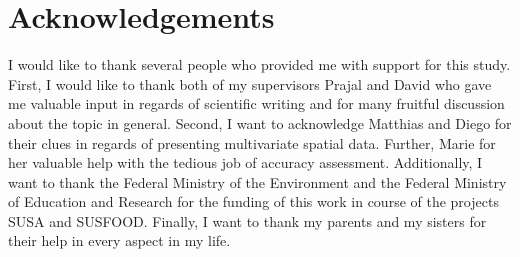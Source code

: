 \chapter*{Acknowledgements}
\label{ch:acknow}
	I would like to thank several people who provided me with support for this study. First, I would like to thank both of my supervisors Prajal and David who gave me valuable input in regards of scientific writing and for many fruitful discussion about the topic in general. Second, I want to acknowledge Matthias and Diego for their clues in regards of presenting multivariate spatial data. Further, Marie for her valuable help with the tedious job of accuracy assessment. Additionally, I want to thank the Federal Ministry of the Environment and the Federal Ministry of Education and Research for the funding of this work in course of the projects SUSA and SUSFOOD. Finally, I want to thank my parents and my sisters for their help in every aspect in my life.